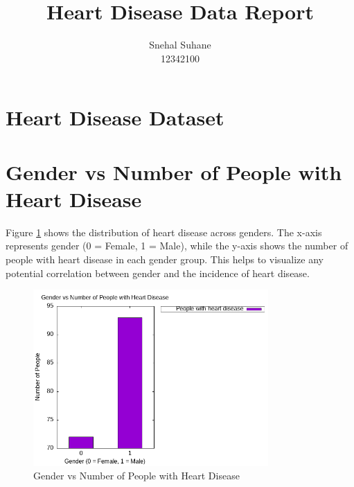 \documentclass{article}
\begin{document}
	\title{\textbf{Heart Disease Data Report}}
	\author{Snehal Suhane \\ 12342100} 
	
	\date{}
	\maketitle
	
	\section*{Heart Disease Dataset}
	
	
	\section{Gender vs Number of People with Heart Disease}
	Figure \ref{fig:fig1} shows the distribution of heart disease across genders. The x-axis represents gender (0 = Female, 1 = Male), while the y-axis shows the number of people with heart disease in each gender group. This helps to visualize any potential correlation between gender and the incidence of heart disease.
	\begin{figure}[h]
		\centering
		\includegraphics[width=0.8\textwidth]{../que4a/que4a.png}
		\caption{Gender vs Number of People with Heart Disease}
		\label{fig:fig1}
	\end{figure}
\end{document}
